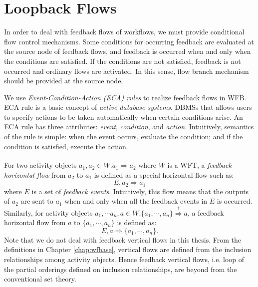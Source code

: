 \section{Loopback Flows}
\label{sec:loopback}

In order to deal with feedback flows of workflows, we must provide
conditional flow control mechanisms.  Some conditions for occurring
feedback are evaluated at the source node of feedback flows, and
feedback is occurred when and only when the conditions are satisfied.
If the conditions are not satisfied, feedback is not occurred and
ordinary flows are activated.  In this sense, flow branch mechanism should be
provided at the source node.  


We use {\em Event-Condition-Action (ECA) rules} \cite{mccarthy:sigmod89}
to realize feedback flows in WFB\@.  ECA rule is a basic concept of {\em
active database systems}, DBMSs that allows users to specify actions to
be taken automatically when certain conditions arise.  An ECA rule has
three attributes: {\em event}, {\em condition}, and {\em action}.
Intuitively, semantics of the rule is simple: when the event occurs,
evaluate the condition; and if the condition is satisfied, execute the
action.

For two activity objects $a_1, a_2 \in W. a_1
\stackrel{+}{\Longrightarrow} a_2$ where $W$ is a WFT, a {\em feedback
horizontal flow} from $a_2$ to $a_1$ is defined as a special horizontal
flow such as:
\[
 E, a_2 \Longrightarrow a_1
\]
where $E$ is a set of \emph{feedback events}.  Intuitively, this flow
means that the outputs of $a_2$ are sent to $a_1$ when and only when all 
the feedback events in $E$ is occurred.  
Similarly, for activity objects $a_1, \cdots
a_n, a \in W. \{a_1, \cdots, a_n\} \stackrel{+}{\Longrightarrow} a$, a
feedback horizontal flow from $a$ to $\{a_1, \cdots, a_n\}$ is defined as:
\[
 E, a \Longrightarrow \{a_1, \cdots, a_n\}.
\]
Note that we do not deal with feedback vertical flows in this thesis.
From the definitions in Chapter \ref{chap:wfbase}, vertical flows are
defined from the inclusion relationships among activity objects.  Hence
feedback vertical flows, i.e. loop of the partial orderings defined on
inclusion relationships, are beyond from the conventional set theory.

